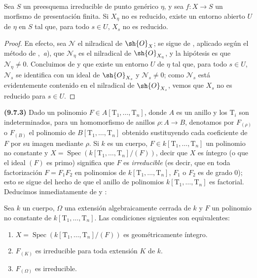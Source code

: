 
\begin{lemma}[9.7.2]
\label{IV.9.7.2}
Sea $S$ un preesquema irreducible de punto genérico $\eta$, y sea $f:X\to S$ un morfismo de presentación finita.
Si $X_\eta$ no es reducido, existe un entorno abierto $U$ de $\eta$ en $S$ tal que, para todo $s\in U$, $X_s$ no es reducido.
\end{lemma}

\begin{proof}
En efecto, sea $\mathscr{N}$ el nilradical de $\sh{O}_X$; se sigue de , aplicado según el método de ,~\emph{a}), que $\mathscr{N}_\eta$ es el nilradical de $\sh{O}_{X_\eta}$, y la hipótesis es que $\mathscr{N}_\eta\neq 0$.
Concluimos de  y  que existe un entorno $U$ de $\eta$ tal que, para todo $s\in U$, $\mathscr{N}_s$ se identifica con un ideal de $\sh{O}_{X_s}$ y $\mathscr{N}_s\neq 0$; como $\mathscr{N}_s$ está evidentemente contenido en el nilradical de $\sh{O}_{X_s}$, vemos que $X_s$ no es reducido para $s\in U$.
\end{proof}

\textbf{(9.7.3)}
\label{IV.9.7.3}
Dado un polinomio $F\in A[\mathrm{T}_1,\ldots,\mathrm{T}_n]$, donde $A$ es un anillo y los $\mathrm{T}_i$ son indeterminados, para un homomorfismo de anillos $\rho:A\to B$, denotamos por $F_{(\rho)}$ o $F_{(B)}$ el polinomio de $B[\mathrm{T}_1,\ldots,\mathrm{T}_n]$ obtenido sustituyendo cada coeficiente de $F$ por su imagen mediante $\rho$.
Si $k$ es un cuerpo, $F\in k[\mathrm{T}_1,\ldots,\mathrm{T}_n]$ un polinomio no constante y $X=\operatorname{Spec}(k[\mathrm{T}_1,\ldots,\mathrm{T}_n]/(F))$, decir que $X$ es íntegro (o que el ideal $(F)$ es primo) significa que $F$ es \emph{irreducible} (es decir, que en toda factorización $F=F_1 F_2$ en polinomios de $k[\mathrm{T}_1,\ldots,\mathrm{T}_n]$, $F_1$ o $F_2$ es de grado $0$); esto se sigue del hecho de que el anillo de polinomios $k[\mathrm{T}_1,\ldots,\mathrm{T}_n]$ es factorial.
Deducimos inmediatamente de  y :

\begin{lemma}[9.7.4]
\label{IV.9.7.4}
Sea $k$ un cuerpo, $\Omega$ una extensión algebraicamente cerrada de $k$ y $F$ un polinomio no constante de $k[\mathrm{T}_1,\ldots,\mathrm{T}_n]$.
Las condiciones siguientes son equivalentes:
\begin{enumerate}[label=\alph*)]
  \item $X=\operatorname{Spec}(k[\mathrm{T}_1,\ldots,\mathrm{T}_n]/(F))$ es geométricamente íntegro.
  \item $F_{(K)}$ es irreducible para toda extensión $K$ de $k$.
  \item $F_{(\Omega)}$ es irreducible.
\end{enumerate}
\end{lemma}

